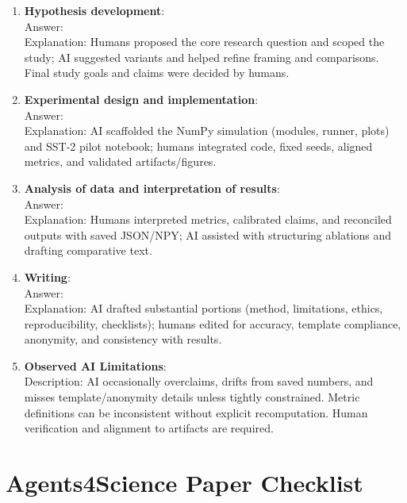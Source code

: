 \documentclass{article}
\begin{document}
\begin{enumerate}
    \item \textbf{Hypothesis development}: 
    \\
    Answer: \involvementB{}
    \\
    Explanation: Humans proposed the core research question and scoped the study; AI suggested variants and helped refine framing and comparisons. Final study goals and claims were decided by humans.

    \item \textbf{Experimental design and implementation}: 
    \\
    Answer: \involvementB{}
    \\
    Explanation: AI scaffolded the NumPy simulation (modules, runner, plots) and SST-2 pilot notebook; humans integrated code, fixed seeds, aligned metrics, and validated artifacts/figures.

    \item \textbf{Analysis of data and interpretation of results}: 
    \\
    Answer: \involvementB{}
    \\
    Explanation: Humans interpreted metrics, calibrated claims, and reconciled outputs with saved JSON/NPY; AI assisted with structuring ablations and drafting comparative text.

    \item \textbf{Writing}: 
    \\
    Answer: \involvementC{}
    \\
    Explanation: AI drafted substantial portions (method, limitations, ethics, reproducibility, checklists); humans edited for accuracy, template compliance, anonymity, and consistency with results.

    \item \textbf{Observed AI Limitations}: 
    \\
    Description: AI occasionally overclaims, drifts from saved numbers, and misses template/anonymity details unless tightly constrained. Metric definitions can be inconsistent without explicit recomputation. Human verification and alignment to artifacts are required.
\end{enumerate}

\section*{Agents4Science Paper Checklist}
\end{document}
